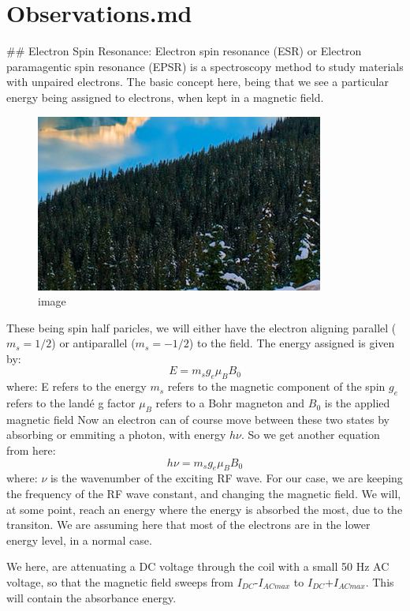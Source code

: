 \documentclass{double}
\begin{document}
\section{Observations.md}
## Electron Spin Resonance:
Electron spin resonance (ESR) or Electron paramagentic spin resonance (EPSR) is a spectroscopy method to study materials with unpaired electrons. The basic concept here, being that we see a particular energy being assigned to electrons, when kept in a magnetic field.
\begin{figure}[H]
\centering
\includegraphics[width = \columnwidth]{./image.png}
\caption{image}
\label{fig:"image"}
\end{figure}
These being spin half paricles, we will either have the electron aligning parallel ($m_s = 1/2$) or antiparallel ($m_s = -1/2$) to the field. The energy assigned is given by:
$$ E = m_s g_e \mu_B B_0 $$
where:
E refers to the energy
$m_s$ refers to the magnetic component of the spin
$g_e$ refers to the landé g factor
$\mu_B$ refers to a Bohr magneton
and $B_0$ is the applied magnetic field
Now an electron can of course move between these two states by absorbing or emmiting a photon, with energy $h\nu$. So we get another equation from here:
$$ h\nu=m_s g_e \mu_B B_0 $$
where:
$\nu$ is the wavenumber of the exciting RF wave.
For our case, we are keeping the frequency of the RF wave constant, and changing the magnetic field. We will, at some point, reach an energy where the energy is absorbed the most, due to the transiton. We are assuming here that most of the electrons are in the lower energy level, in a normal case.

We here, are attenuating a DC voltage through the coil with a small 50 Hz AC voltage, so that the magnetic field sweeps from $I_{DC}$-$I_{AC max}$ to $I_{DC}$+$I_{AC max}$. This will contain the absorbance energy.
\end{document}
